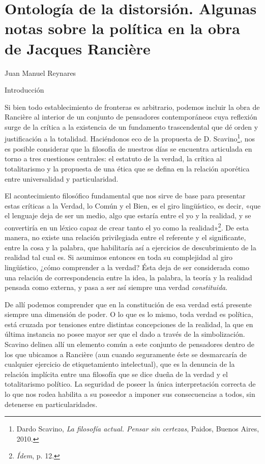 \chapter{Ontología de la distorsión. Algunas notas sobre la política en la obra de Jacques Rancière}

{}

Juan Manuel Reynares

{Introducción}


Si bien todo establecimiento de fronteras es arbitrario, podemos incluir la obra de Rancière al interior de un conjunto de pensadores contemporáneos cuya reflexión surge de la crítica a la existencia de un fundamento trascendental que dé orden y justificación a la totalidad. Haciéndonos eco de la propuesta de D. Scavino\footnote{Dardo Scavino, \emph{La filosofía actual. Pensar sin certezas}, Paidos, Buenos Aires, 2010.}, nos es posible considerar que la filosofía de nuestros días se encuentra articulada en torno a tres cuestiones centrales: el estatuto de la verdad, la crítica al totalitarismo y la propuesta de una ética que se defina en la relación aporética entre universalidad y particularidad.

El acontecimiento filosófico fundamental que nos sirve de base para presentar estas críticas a la Verdad, lo Común y el Bien, es el giro lingüístico, es decir, «que el lenguaje deja de ser un medio, algo que estaría entre el yo y la realidad, y se convertiría en un léxico capaz de crear tanto el yo como la realidad»\footnote{\emph{Ídem}, p. 12.}. De esta manera, no existe una relación privilegiada entre el referente y el significante, entre la cosa y la palabra, que habilitaría así a ejercicios de descubrimiento de la realidad tal cual es. Si asumimos entonces en toda su complejidad al giro lingüístico, ¿cómo comprender a la verdad? Ésta deja de ser considerada como una relación de correspondencia entre la idea, la palabra, la teoría y la realidad pensada como externa, y pasa a ser así siempre una verdad \emph{constituida}.

De allí podemos comprender que en la constitución de esa verdad está presente siempre una dimensión de poder. O lo que es lo mismo, toda verdad es política, está cruzada por tensiones entre distintas concepciones de la realidad, la que en última instancia no posee mayor ser que el dado a través de la simbolización. Scavino delinea allí un elemento común a este conjunto de pensadores dentro de los que ubicamos a Rancière (aun cuando seguramente éste se desmarcaría de cualquier ejercicio de etiquetamiento intelectual), que es la denuncia de la relación implícita entre una filosofía que se dice dueña de la verdad y el totalitarismo político. La seguridad de poseer la única interpretación correcta de lo que nos rodea habilita a su poseedor a imponer sus consecuencias a todos, sin detenerse en particularidades.

